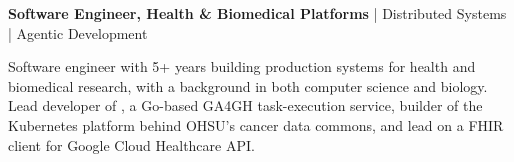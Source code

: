 \begin{center}
    \large\textbf{\textcolor{accent}{Software Engineer, Health \& Biomedical Platforms}} \textcolor{my-grey}{|} Distributed Systems \textcolor{my-grey}{|} Agentic Development
\end{center}

\vspace{0.2em}

Software engineer with 5+ years building production systems for health and biomedical research, with a background in both computer science and biology.
Lead developer of , a Go-based GA4GH task-execution service, builder of the Kubernetes platform behind OHSU's cancer data commons, and lead on a FHIR client for Google Cloud Healthcare API.

